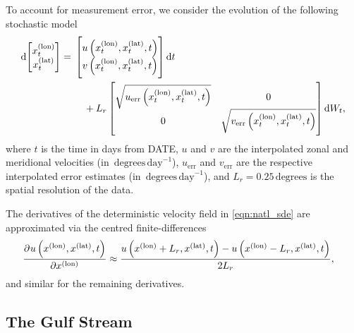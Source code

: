 To account for measurement error, we consider the evolution of the following stochastic model
\begin{equation}
	\dif \begin{bmatrix}
		x^{(\mathrm{lon})}_t \\ x^{(\mathrm{lat})}_t
	\end{bmatrix} = \begin{multlined}[t]
		\begin{bmatrix} u\left(x^{(\mathrm{lon})}_t, x^{(\mathrm{lat})}_t, t\right) \\ v\left(x^{(\mathrm{lon})}_t, x^{(\mathrm{lat})}_t, t\right) \end{bmatrix}\dif t \\
		+ L_r\begin{bmatrix}
			\sqrt{u_{\mathrm{err}}\left(x^{(\mathrm{lon})}_t, x^{(\mathrm{lat})}_t, t\right)} & 0                                                                                 \\
			0                                                                                 & \sqrt{v_{\mathrm{err}}\left(x^{(\mathrm{lon})}_t, x^{(\mathrm{lat})}_t, t\right)}
		\end{bmatrix} \dif W_t,
	\end{multlined}
	\label{eqn:natl_sde}
\end{equation}
where \(t\) is the time in days from DATE, \(u\) and \(v\) are the interpolated zonal and meridional velocities (in \(\mathrm{\,degrees\,day}^{-1}\)), \(u_{\mathrm{err}}\) and \(v_{\mathrm{err}}\) are the respective interpolated error estimates (in \(\mathrm{\,degrees\,day}^{-1}\)), and \(L_r = 0.25 \mathrm{\,degrees}\) is the spatial resolution of the data.



The derivatives of the deterministic velocity field in \eqref{eqn:natl_sde} are approximated via the centred finite-differences
\begin{align*}
	\dpd{u\left({x^{(\text{lon})}}, {x^{(\text{lat})}}, t\right)}{{x^{(\text{lon})}}} & \approx \frac{u\left(x^{(\text{lon})} + L_r, x^{(\text{lat})}, t\right) - u\left(x^{(\text{lon})} - L_r, x^{(\text{lat})}, t\right)}{2 L_r},
\end{align*}
and similar for the remaining derivatives.


\subsection{The Gulf Stream}\label{sec:gulf_stream}



